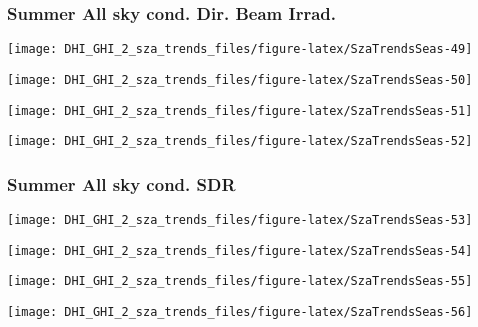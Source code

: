 \documentclass[
  10pt,
  a4paper,oneside]{article}
\begin{document}
\newpage

\hypertarget{summer-all-sky-cond.-dir.-beam-irrad.}{%
\subsubsection{Summer All sky cond. Dir. Beam Irrad.}\label{summer-all-sky-cond.-dir.-beam-irrad.}}

\begin{center}\texttt{[image: DHI\_GHI\_2\_sza\_trends\_files/figure-latex/SzaTrendsSeas-49]} \end{center}

\begin{center}\texttt{[image: DHI\_GHI\_2\_sza\_trends\_files/figure-latex/SzaTrendsSeas-50]} \end{center}

\begin{center}\texttt{[image: DHI\_GHI\_2\_sza\_trends\_files/figure-latex/SzaTrendsSeas-51]} \end{center}

\begin{center}\texttt{[image: DHI\_GHI\_2\_sza\_trends\_files/figure-latex/SzaTrendsSeas-52]} \end{center}

\newpage

\hypertarget{summer-all-sky-cond.-sdr}{%
\subsubsection{Summer All sky cond. SDR}\label{summer-all-sky-cond.-sdr}}

\begin{center}\texttt{[image: DHI\_GHI\_2\_sza\_trends\_files/figure-latex/SzaTrendsSeas-53]} \end{center}

\begin{center}\texttt{[image: DHI\_GHI\_2\_sza\_trends\_files/figure-latex/SzaTrendsSeas-54]} \end{center}

\begin{center}\texttt{[image: DHI\_GHI\_2\_sza\_trends\_files/figure-latex/SzaTrendsSeas-55]} \end{center}

\begin{center}\texttt{[image: DHI\_GHI\_2\_sza\_trends\_files/figure-latex/SzaTrendsSeas-56]} \end{center}
\end{document}
